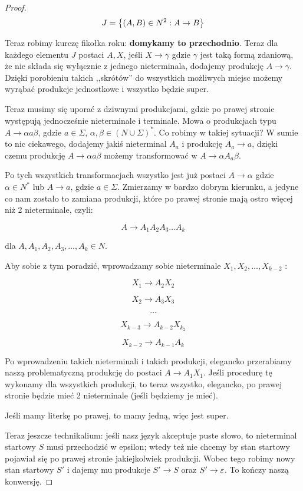 \begin{proof}
   \[ 
        J = \set{(A, B) \in N^2 : A \rightarrow B}
   \]
   
   Teraz robimy kurczę fikołka roku: \textbf{domykamy to przechodnio}. Teraz dla każdego elementu \(J\) postaci \(A, X\), jeśli \(X \rightarrow \gamma\) gdzie \(\gamma\) jest taką formą zdaniową, że nie składa się wyłącznie z jednego nieterminala, dodajemy produkcję \(A \rightarrow \gamma\). Dzięki porobieniu takich ,,skrótów'' do wszystkich możliwych miejsc możemy wyrąbać produkcje jednostkowe i wszystko będzie super.
   
   Teraz musimy się uporać z dziwnymi produkcjami, gdzie po prawej stronie występują jednocześnie nieterminale i terminale. Mowa o produkcjach typu \(A \rightarrow \alpha a \beta\), gdzie \(a\in\Sigma\), \(\alpha, \beta \in (N \cup \Sigma)^*\).  Co robimy w takiej sytuacji? W sumie to nic ciekawego, dodajemy jakiś nieterminal \(A_a\) i produkcję \( A_a \rightarrow a\), dzięki czemu produkcję \(A \rightarrow \alpha a \beta\) możemy transformować w \(A \rightarrow \alpha A_a \beta\).
   
   Po tych wszystkich transformacjach wszystko jest już postaci \(A \rightarrow \alpha \) gdzie \( \alpha \in N^*\) lub \(A \rightarrow a\), gdzie \(a \in \Sigma\). Zmierzamy w bardzo dobrym kierunku, a jedyne co nam zostało to zamiana produkcji, które po prawej stronie mają ostro więcej niż 2 nieterminale, czyli:
   
   \[ 
        A \rightarrow A_1 A_2 A_3\dots A_k 
   \]
   
   dla \(A,A_1, A_2, A_3, \dots, A_k \in N\). 
   
   Aby sobie z tym poradzić, wprowadzamy sobie nieterminale \(X_1, X_2, \dots, X_{k-2}\) :
   
   \[ 
        X_1 \rightarrow A_2 X_2
   \]
   
   \[ 
        X_2 \rightarrow A_3 X_3
    \] 
    
    \[ 
        \dots
    \] 
    
    \[ 
        X_{k-3} \rightarrow A_{k-2} X_{k_2}
    \]
    
    \[ 
        X_{k-2} \rightarrow A_{k-1} A_{k}
    \]
    
    Po wprowadzeniu takich nieterminali i takich produkcji, elegancko przerabiamy naszą problematyczną produkcję do postaci \( A \rightarrow A_1 X_1 \). Jeśli procedurę tę wykonamy dla wszystkich produkcji, to teraz wszystko, elegancko, po prawej stronie będzie mieć 2 nieterminale (jeśli będziemy je mieć). 
    
    Jeśli mamy literkę po prawej, to mamy jedną, więc jest super. 
    
    Teraz jeszcze technikalium: jeśli nasz język akceptuje puste słowo, to nieterminal startowy \(S\) musi przechodzić w epsilon; wtedy też nie chcemy by stan startowy pojawiał się po prawej stronie jakiejkolwiek produkcji. Wobec tego robimy nowy stan startowy \(S'\) i dajemy mu produkcje \(S' \rightarrow S\) oraz \(S' \rightarrow \varepsilon\). To kończy naszą konwersję. 
    
\end{proof}